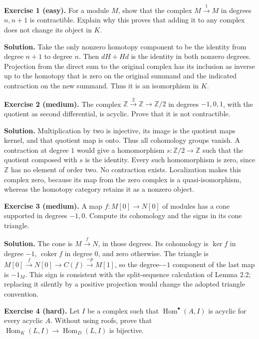 \documentclass[
  english,
  11pt,
  a4paper,
]{article}
\begin{document}
\textbf{Exercise 1 (easy).} For a module \(M\), show that the complex
\(M\xrightarrow1M\) in degrees \(n,n+1\) is contractible. Explain why
this proves that adding it to any complex does not change its object in
\(K\).

\textbf{Solution.} Take the only nonzero homotopy component to be the
identity from degree \(n+1\) to degree \(n\). Then \(dH+Hd\) is the
identity in both nonzero degrees. Projection from the direct sum to the
original complex has its inclusion as inverse up to the homotopy that is
zero on the original summand and the indicated contraction on the new
summand. Thus it is an isomorphism in \(K\).

\textbf{Exercise 2 (medium).} The complex
\(\mathbb Z\xrightarrow2\mathbb Z\to\mathbb Z/2\) in degrees \(-1,0,1\),
with the quotient as second differential, is acyclic. Prove that it is
not contractible.

\textbf{Solution.} Multiplication by two is injective, its image is the
quotient map\textquotesingle s kernel, and that quotient map is onto.
Thus all cohomology groups vanish. A contraction at degree \(1\) would
give a homomorphism \(s:\mathbb Z/2\to\mathbb Z\) such that the quotient
composed with \(s\) is the identity. Every such homomorphism is zero,
since \(\mathbb Z\) has no element of order two. No contraction exists.
Localization makes this complex zero, because its map from the zero
complex is a quasi-isomorphism, whereas the homotopy category retains it
as a nonzero object.

\textbf{Exercise 3 (medium).} A map \(f:M[0]\to N[0]\) of modules has a
cone supported in degrees \(-1,0\). Compute its cohomology and the signs
in its cone triangle.

\textbf{Solution.} The cone is \(M\xrightarrow fN\), in those degrees.
Its cohomology is \(\ker f\) in degree \(-1\), \(\operatorname{coker}f\)
in degree \(0\), and zero otherwise. The triangle is
\(M[0]\xrightarrow fN[0]\to C(f)\xrightarrow{-p}M[1]\), so the
degree-\(-1\) component of the last map is \(-1_M\). This sign is
consistent with the split-sequence calculation of Lemma 2.2; replacing
it silently by a positive projection would change the adopted triangle
convention.

\textbf{Exercise 4 (hard).} Let \(I\) be a complex such that
\(\operatorname{Hom}^{\bullet}(A,I)\) is acyclic for every acyclic
\(A\). Without using roofs, prove that
\(\operatorname{Hom}_K(L,I)\to\operatorname{Hom}_D(L,I)\) is bijective.
\end{document}
